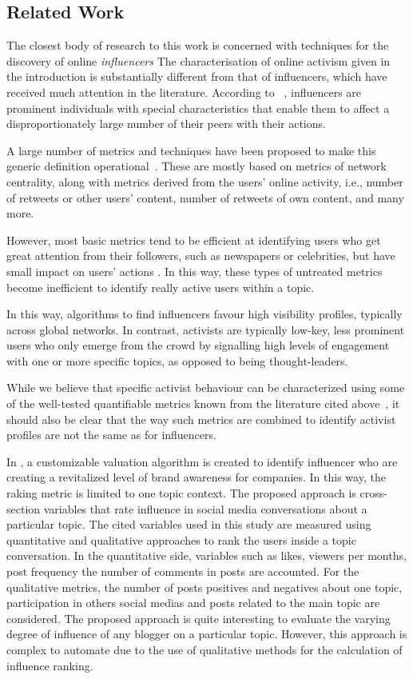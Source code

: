 \subsection{Related Work}

The closest body of research to this work is concerned with techniques for the discovery of online \textit{influencers} 
The characterisation of online activism given in the introduction is substantially different from that of influencers, which have received much attention in the literature.
According to ~\cite{Kardara2015}, influencers are prominent individuals with special characteristics that enable them to	affect a disproportionately large number of their peers with their actions.

A large number of metrics and techniques have been proposed to make this generic definition operational~\cite{RIQUELME2016949}. These are mostly based on metrics of network centrality, along with metrics derived from the users' online activity, i.e., number of retweets or other users' content, number of retweets of own content, and many more. 

However, most basic metrics tend to be efficient at identifying users who get great attention from their followers, such as newspapers or celebrities, but have small impact on users' actions \cite{Cha2010MeasuringUI}. In this way, these types of untreated metrics become inefficient to identify really active users within a topic.

In this way, algorithms to find influencers favour high visibility profiles, typically across global networks. In contrast, activists are typically low-key, less prominent users who only emerge from the crowd by signalling high levels of engagement with one or more specific topics, as opposed to being thought-leaders. 

While we believe that specific activist behaviour can be characterized using some of the well-tested quantifiable metrics known from the literature cited above~\cite{RIQUELME2016949}, it should also be clear that the way such metrics are combined to identify activist profiles are not the same as for influencers. 

In \cite{MATIC2011}, a customizable valuation algorithm is created to identify influencer who are creating a revitalized level of brand awareness for companies. In this way, the raking metric is limited to one topic context. The proposed approach is cross-section variables that rate influence in social media conversations about a particular topic. The cited variables used in this study are measured using quantitative and qualitative approaches to rank the users inside a topic conversation. In the quantitative side, variables such as likes, viewers per months, post frequency the number of comments in posts are accounted. For the qualitative metrics, the number of posts positives and negatives about one topic, participation in others social medias and posts related to the main topic are considered.  The proposed approach is quite interesting to evaluate the varying degree of influence of any blogger on a particular topic. However, this approach is complex to automate due to the use of qualitative methods for the calculation of influence ranking.

